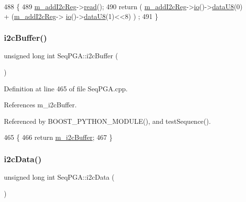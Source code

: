 \begin{DoxyCode}
488                                 \{
489   \hyperlink{classSeqPGA_ac3a6aad3fec65ceb78528b6d20deeb3f}{m\_addI2cReg}->\hyperlink{classIOobject_aa07610c11963b1db6710e3c76ceea456}{read}();
490   \textcolor{keywordflow}{return} ( \hyperlink{classSeqPGA_ac3a6aad3fec65ceb78528b6d20deeb3f}{m\_addI2cReg}->\hyperlink{classIOobject_af04fb94137c3d86849f478ac5afab5d1}{io}()->\hyperlink{classIOdata_a75e9c318dbac3a39402179070943d4bc}{dataU8}(0) + (\hyperlink{classSeqPGA_ac3a6aad3fec65ceb78528b6d20deeb3f}{m\_addI2cReg}->
      \hyperlink{classIOobject_af04fb94137c3d86849f478ac5afab5d1}{io}()->\hyperlink{classIOdata_a75e9c318dbac3a39402179070943d4bc}{dataU8}(1)<<8) ) ;
491 \}
\end{DoxyCode}
\mbox{\label{classSeqPGA_a3d441522bfe5a6d35b8a77cbcd38b49e}} 
\subsubsection{\texorpdfstring{i2c\+Buffer()}{i2cBuffer()}}
{\footnotesize\ttfamily unsigned long int Seq\+P\+G\+A\+::i2c\+Buffer (\begin{DoxyParamCaption}{ }\end{DoxyParamCaption})}



Definition at line 465 of file Seq\+P\+G\+A.\+cpp.



References m\+\_\+i2c\+Buffer.



Referenced by B\+O\+O\+S\+T\+\_\+\+P\+Y\+T\+H\+O\+N\+\_\+\+M\+O\+D\+U\+L\+E(), and test\+Sequence().


\begin{DoxyCode}
465                                    \{
466   \textcolor{keywordflow}{return} \hyperlink{classSeqPGA_afcef519379e9c6ba624ba58a4eac79f1}{m\_i2cBuffer};
467 \}
\end{DoxyCode}
\mbox{\label{classSeqPGA_a5e48f7b7ca1ada5a1decc0436dda4b26}} 
\subsubsection{\texorpdfstring{i2c\+Data()}{i2cData()}}
{\footnotesize\ttfamily unsigned long int Seq\+P\+G\+A\+::i2c\+Data (\begin{DoxyParamCaption}{ }\end{DoxyParamCaption})}



